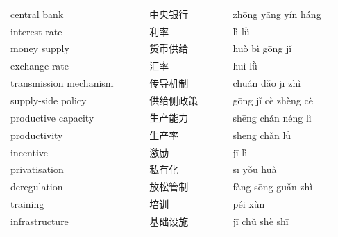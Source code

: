 \documentclass[11pt]{article}
\begin{document}
\begin{longtable}{@{}p{0.40\linewidth}p{0.24\linewidth}p{0.30\linewidth}@{}}
central bank & 中央银行 & zhōng yāng yín háng \\
interest rate & 利率 & lì lǜ \\
money supply & 货币供给 & huò bì gōng jǐ \\
exchange rate & 汇率 & huì lǜ \\
transmission mechanism & 传导机制 & chuán dǎo jī zhì \\
supply-side policy & 供给侧政策 & gōng jǐ cè zhèng cè \\
productive capacity & 生产能力 & shēng chǎn néng lì \\
productivity & 生产率 & shēng chǎn lǜ \\
incentive & 激励 & jī lì \\
privatisation & 私有化 & sī yǒu huà \\
deregulation & 放松管制 & fàng sōng guǎn zhì \\
training & 培训 & péi xùn \\
infrastructure & 基础设施 & jī chǔ shè shī \\
\end{longtable}
\end{document}
